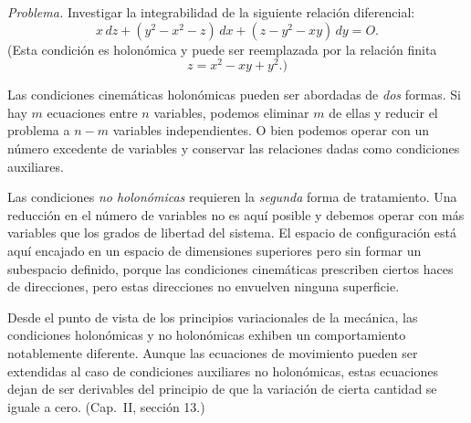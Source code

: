 \documentclass[12pt,a4paper]{book}
\begin{document}
\begin{center}
\textit{Problema.} Investigar la integrabilidad de la siguiente relaci\'on diferencial:
\begin{equation}
x\,dz + (y^2 - x^2 - z)\,dx + (z - y^2 - xy)\,dy = O.
\tag{16.9}
\end{equation}
(Esta condici\'on es holon\'omica y puede ser reemplazada por la relaci\'on finita
\begin{equation}
z = x^2 - xy + y^2.)
\tag{16.10}
\end{equation}

Las condiciones cinem\'aticas holon\'omicas pueden ser abordadas de \textit{dos} formas. Si hay $m$ ecuaciones entre $n$ variables, podemos eliminar $m$ de ellas y reducir el problema a $n - m$ variables independientes. O bien podemos operar con un n\'umero excedente de variables y conservar las relaciones dadas como condiciones auxiliares.

Las condiciones \textit{no holon\'omicas} requieren la \textit{segunda} forma de tratamiento. Una reducci\'on en el n\'umero de variables no es aqu\'i posible y debemos operar con m\'as variables que los grados de libertad del sistema. El espacio de configuraci\'on est\'a aqu\'i encajado en un espacio de dimensiones superiores pero sin formar un subespacio definido, porque las condiciones cinem\'aticas prescriben ciertos haces de direcciones, pero estas direcciones no envuelven ninguna superficie.

Desde el punto de vista de los principios variacionales de la mec\'anica, las condiciones holon\'omicas y no holon\'omicas exhiben un comportamiento notablemente diferente. Aunque las ecuaciones de movimiento pueden ser extendidas al caso de condiciones auxiliares no holon\'omicas, estas ecuaciones dejan de ser derivables del principio de que la variaci\'on de cierta cantidad se iguale a cero. (Cap.\ II, secci\'on 13.)

\begin{center}
\end{center}



\end{center}
\end{document}
